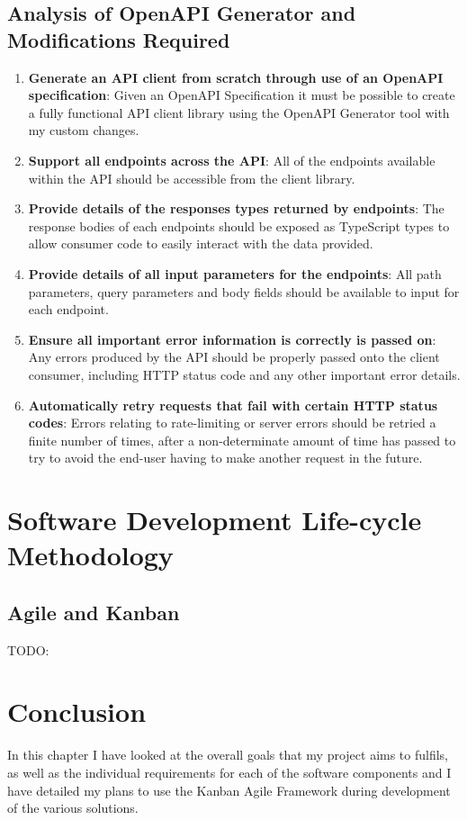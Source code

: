 \subsection{Analysis of OpenAPI Generator and Modifications Required}
\begin{enumerate}
    \item \textbf{Generate an API client from scratch through use of an OpenAPI specification}: Given an OpenAPI Specification it must be possible to create a fully functional API client library using the OpenAPI Generator tool with my custom changes.
    \item \textbf{Support all endpoints across the API}: All of the endpoints available within the API should be accessible from the client library.
    \item \textbf{Provide details of the responses types returned by endpoints}: The response bodies of each endpoints should be exposed as TypeScript types to allow consumer code to easily interact with the data provided.
    \item \textbf{Provide details of all input parameters for the endpoints}: All path parameters, query parameters and body fields should be available to input for each endpoint.
    \item \textbf{Ensure all important error information is correctly is passed on}: Any errors produced by the API should be properly passed onto the client consumer, including HTTP status code and any other important error details.
    \item \textbf{Automatically retry requests that fail with certain HTTP status codes}: Errors relating to rate-limiting or server errors should be retried a finite number of times, after a non-determinate amount of time has passed to try to avoid the end-user having to make another request in the future.
\end{enumerate}

\section{Software Development Life-cycle Methodology}
\subsection{Agile and Kanban}

TODO:

\section{Conclusion}
In this chapter I have looked at the overall goals that my project aims to fulfils, as well as the individual requirements for each of the software components and I have detailed my plans to use the Kanban Agile Framework during development of the various solutions.